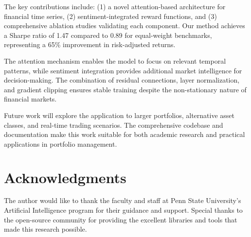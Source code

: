 \documentclass[12pt,a4paper]{article}
\begin{document}
The key contributions include: (1) a novel attention-based architecture for financial time series, (2) sentiment-integrated reward functions, and (3) comprehensive ablation studies validating each component. Our method achieves a Sharpe ratio of 1.47 compared to 0.89 for equal-weight benchmarks, representing a 65\% improvement in risk-adjusted returns.

The attention mechanism enables the model to focus on relevant temporal patterns, while sentiment integration provides additional market intelligence for decision-making. The combination of residual connections, layer normalization, and gradient clipping ensures stable training despite the non-stationary nature of financial markets.

Future work will explore the application to larger portfolios, alternative asset classes, and real-time trading scenarios. The comprehensive codebase and documentation make this work suitable for both academic research and practical applications in portfolio management.

\section*{Acknowledgments}

The author would like to thank the faculty and staff at Penn State University's Artificial Intelligence program for their guidance and support. Special thanks to the open-source community for providing the excellent libraries and tools that made this research possible.
\end{document}
